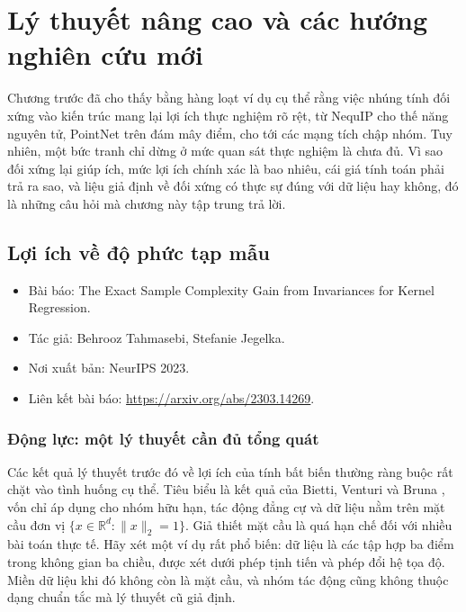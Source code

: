 % 
\section{Lý thuyết nâng cao và các hướng nghiên cứu mới}
\label{sec:ly-thuyet-nang-cao}

Chương trước đã cho thấy bằng hàng loạt ví dụ cụ thể rằng việc nhúng tính đối xứng vào kiến trúc mang lại lợi ích thực nghiệm rõ rệt, từ NequIP cho thế năng nguyên tử, PointNet trên đám mây điểm, cho tới các mạng tích chập nhóm. Tuy nhiên, một bức tranh chỉ dừng ở mức quan sát thực nghiệm là chưa đủ. Vì sao đối xứng lại giúp ích, mức lợi ích chính xác là bao nhiêu, cái giá tính toán phải trả ra sao, và liệu giả định về đối xứng có thực sự đúng với dữ liệu hay không, đó là những câu hỏi mà chương này tập trung trả lời.



\subsection{Lợi ích về độ phức tạp mẫu}
\label{subsec:sample-complexity}
 
\begin{itemize}
    \item Bài báo: The Exact Sample Complexity Gain from Invariances for Kernel Regression.
    \item Tác giả: Behrooz Tahmasebi, Stefanie Jegelka.
    \item Nơi xuất bản: NeurIPS 2023.
    \item Liên kết bài báo: \url{https://arxiv.org/abs/2303.14269}.
\end{itemize}
 
 
\subsubsection{Động lực: một lý thuyết cần đủ tổng quát}
 
Các kết quả lý thuyết trước đó về lợi ích của tính bất biến thường ràng buộc rất chặt vào tình huống cụ thể. Tiêu biểu là kết quả của Bietti, Venturi và Bruna \cite{bietti2021sample}, vốn chỉ áp dụng cho nhóm hữu hạn, tác động đẳng cự và dữ liệu nằm trên mặt cầu đơn vị $\{x \in \mathbb{R}^d : \|x\|_2 = 1\}$. Giả thiết mặt cầu là quá hạn chế đối với nhiều bài toán thực tế. Hãy xét một ví dụ rất phổ biến: dữ liệu là các tập hợp ba điểm trong không gian ba chiều, được xét dưới phép tịnh tiến và phép đổi hệ tọa độ. Miền dữ liệu khi đó không còn là mặt cầu, và nhóm tác động cũng không thuộc dạng chuẩn tắc mà lý thuyết cũ giả định.
 
